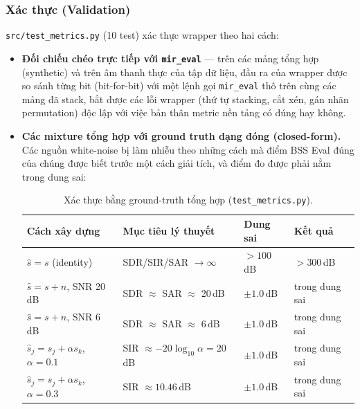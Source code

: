 \documentclass[11pt]{article}
\begin{document}
\subsubsection{Xác thực (Validation)}
\label{sec:validation}

\texttt{src/test\_metrics.py} (10 test) xác thực wrapper theo hai cách:

\begin{itemize}
  \item \textbf{Đối chiếu chéo trực tiếp với \texttt{mir\_eval}} --- trên
    các mảng tổng hợp (synthetic) và trên âm thanh thực của tập dữ liệu,
    đầu ra của wrapper được so sánh từng bit (bit-for-bit) với một lệnh
    gọi \texttt{mir\_eval} thô trên cùng các mảng đã stack, bắt được các
    lỗi wrapper (thứ tự stacking, cắt xén, gán nhãn permutation) độc lập
    với việc bản thân metric nền tảng có đúng hay không.
  \item \textbf{Các mixture tổng hợp với ground truth dạng đóng
    (closed-form).} Các nguồn white-noise bị làm nhiễu theo những cách mà
    điểm BSS Eval đúng của chúng được biết trước một cách giải tích, và
    điểm đo được phải nằm trong dung sai:

  \begin{table}[H]
  \centering
  \caption{Xác thực bằng ground-truth tổng hợp (\texttt{test\_metrics.py}).}
  \label{tab:synthtests}
  \begin{tabular}{@{}llll@{}}
  \toprule
  Cách xây dựng & Mục tiêu lý thuyết & Dung sai & Kết quả \\
  \midrule
  $\hat{s}=s$ (identity) & SDR/SIR/SAR $\to \infty$ & $>100$\,dB & $>300$\,dB \\
  $\hat{s}=s+n$, SNR 20\,dB & SDR $\approx$ SAR $\approx$ 20\,dB & $\pm 1.0$\,dB & trong dung sai \\
  $\hat{s}=s+n$, SNR 6\,dB & SDR $\approx$ SAR $\approx$ 6\,dB & $\pm 1.0$\,dB & trong dung sai \\
  $\hat{s}_j = s_j + \alpha s_k$, $\alpha{=}0.1$ & SIR $\approx -20\log_{10}\alpha = 20$\,dB & $\pm 1.0$\,dB & trong dung sai \\
  $\hat{s}_j = s_j + \alpha s_k$, $\alpha{=}0.3$ & SIR $\approx 10.46$\,dB & $\pm 1.0$\,dB & trong dung sai \\
  \bottomrule
  \end{tabular}
  \end{table}
\end{itemize}
\end{document}

